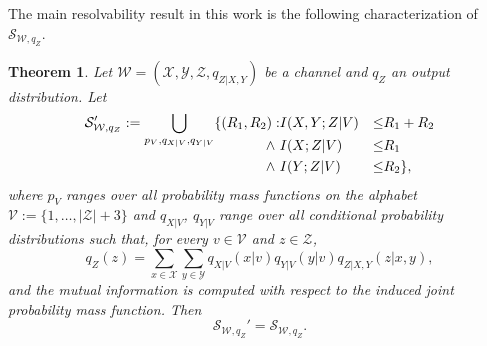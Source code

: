 \documentclass[journal]{IEEEtran}
\newcommand{\channelpmf}{q}
\newcommand{\codebookpmf}{p}
\newcommand{\codebookRateOne}{R_1}
\newcommand{\codebookRateTwo}{R_2}
\newcommand{\channelInOne}{X}
\newcommand{\channelInOneAlph}{\mathcal{X}}
\newcommand{\channelInOneAlphElement}{x}
\newcommand{\channelInTwo}{Y}
\newcommand{\channelInTwoAlph}{\mathcal{Y}}
\newcommand{\channelInTwoAlphElement}{y}
\newcommand{\channelOut}{Z}
\newcommand{\channelOutAlph}{\mathcal{Z}}
\newcommand{\channelOutAlphElement}{z}
\newcommand{\channel}{\mathcal{W}}
\newcommand{\mutualInformationConditional}[3]{I(#1;#2|#3)}
\newcommand{\cardinality}[1]{\lvert #1 \rvert}
\newcommand{\timeSharingRV}{V}
\newcommand{\timeSharingAlph}{\mathcal{V}}
\newcommand{\timeSharingAlphElement}{v}
\newcommand{\capacityRegion}[2]{\mathcal{S}_{#1, #2}}
\newtheorem{theorem}{Theorem}
\begin{document}
The main resolvability result in this work is the following characterization of $\capacityRegion{\channel}{\channelpmf_\channelOut}$.
\begin{theorem}
\label{theorem:resolvability-region}
Let $\channel = (\channelInOneAlph, \channelInTwoAlph, \channelOutAlph, \channelpmf_{\channelOut | \channelInOne, \channelInTwo})$ be a channel and $\channelpmf_\channelOut$ an output distribution. Let
\begin{alignat*}{2}
\label{capacity-theorem-input-condition}
\capacityRegion{\channel}{\channelpmf_\channelOut}'
:=
\smash{\bigcup\limits_{\codebookpmf_\timeSharingRV, \channelpmf_{\channelInOne | \timeSharingRV}, \channelpmf_{\channelInTwo | \timeSharingRV}}}
  \{(\codebookRateOne, \codebookRateTwo):
    &\mutualInformationConditional{\channelInOne, \channelInTwo}{\channelOut}{\timeSharingRV} &\leq& \codebookRateOne + \codebookRateTwo
    \\
    \wedge~
    &\mutualInformationConditional{\channelInOne}{\channelOut}{\timeSharingRV} &\leq& \codebookRateOne
    \\
    \wedge~
    &\mutualInformationConditional{\channelInTwo}{\channelOut}{\timeSharingRV} &\leq& \codebookRateTwo
  \},
\end{alignat*}
where $\codebookpmf_\timeSharingRV$ ranges over all probability mass functions on the alphabet $\timeSharingAlph := \{1, \dots, \cardinality{\channelOutAlph} + 3\}$ and $\channelpmf_{\channelInOne | \timeSharingRV}$, $\channelpmf_{\channelInTwo | \timeSharingRV}$ range over all conditional probability distributions such that, for every $\timeSharingAlphElement \in \timeSharingAlph$ and $\channelOutAlphElement \in \channelOutAlph$,
\[
\channelpmf_\channelOut(\channelOutAlphElement)
=
\sum\limits_{\channelInOneAlphElement \in \channelInOneAlph}
\sum\limits_{\channelInTwoAlphElement \in \channelInTwoAlph}
  \channelpmf_{\channelInOne | \timeSharingRV}(\channelInOneAlphElement | \timeSharingAlphElement)
  \channelpmf_{\channelInTwo | \timeSharingRV}(\channelInTwoAlphElement | \timeSharingAlphElement)
  \channelpmf_{\channelOut | \channelInOne, \channelInTwo}(\channelOutAlphElement | \channelInOneAlphElement, \channelInTwoAlphElement),
\]
and the mutual information is computed with respect to the induced joint probability mass function. Then
\[
\capacityRegion{\channel}{\channelpmf_\channelOut}' = \capacityRegion{\channel}{\channelpmf_\channelOut}.
\]
\end{theorem}
\end{document}
